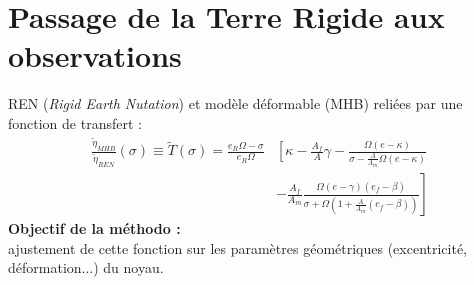\section{Passage de la Terre Rigide aux observations}

\begin{frame}
   REN (\textit{Rigid Earth Nutation}) et modèle déformable (MHB) reliées par une fonction de transfert :
   \begin{align*}
     \frac{\tilde{\eta}_{MHB}}{\tilde{\eta}_{REN}}(\sigma) 
     \equiv
     \tilde{T}(\sigma) 
     = \frac{e_R\Omega-\sigma}{e_R\Omega} &\left[ \kappa - \frac{A_f}{A}\gamma\right.- \frac{\Omega(e-\kappa)}{\sigma-\frac{A}{A_m}\Omega(e-\kappa)}\\
     &-\left. \frac{A_f}{A_m} \frac{\Omega (e-\gamma)(e_f-\beta)}{\sigma + \Omega(1+ \frac{A}{A_m}(e_f-\beta))}\right]
   \end{align*}
   	 \textbf{Objectif de la méthodo :}
   	\\ajustement de cette fonction sur les paramètres géométriques (excentricité, déformation...) du noyau. 
\end{frame}